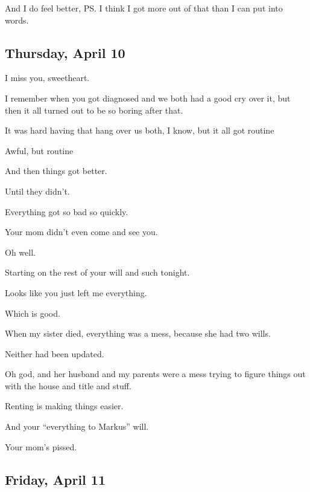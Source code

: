 { And I do feel better, PS. I think I got more out of that than I can put into words.

\newpage

\subsection*{Thursday, April 10}\label{thursday-april-10}

 I miss you, sweetheart.

 I remember when you got diagnosed and we both had a good cry over it, but then it all turned out to be so boring after that.

 It was hard having that hang over us both, I know, but it all got routine

 Awful, but routine

 And then things got better.

 Until they didn't.

 Everything got so bad so quickly.

 Your mom didn't even come and see you.

 Oh well.

 Starting on the rest of your will and such tonight.

 Looks like you just left me everything.

 Which is good.

 When my sister died, everything was a mess, because she had two wills.

 Neither had been updated.

 Oh god, and her husband and my parents were a mess trying to figure things out with the house and title and stuff.

 Renting is making things easier.

 And your ``everything to Markus'' will.

 Your mom's pissed.

\newpage

\subsection*{Friday, April 11}\label{friday-april-11}

}
